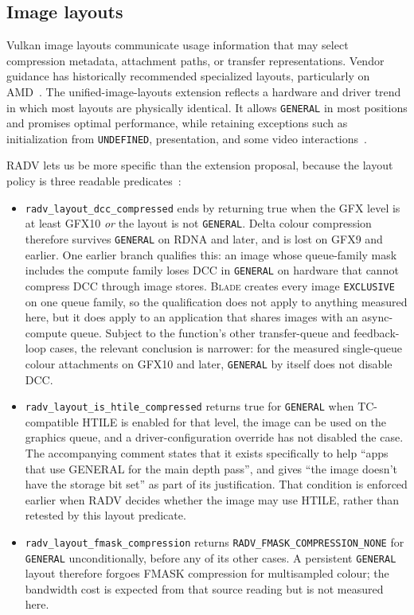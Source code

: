 \documentclass[10pt,twocolumn]{article}
\newcommand{\blade}{\textsc{Blade}}
\begin{document}
\subsection{Image layouts}

Vulkan image layouts communicate usage information that may select compression
metadata, attachment paths, or transfer representations. Vendor guidance has
historically recommended specialized layouts, particularly on
AMD~\cite{amd-rdna-guide}. The unified-image-layouts extension reflects a
hardware and driver trend in which most layouts are physically identical. It
allows \texttt{GENERAL} in most positions and promises optimal performance,
while retaining exceptions such as initialization from
\texttt{UNDEFINED}, presentation, and some video
interactions~\cite{vulkan-unified-layouts}.

RADV lets us be more specific than the extension proposal, because the layout
policy is three readable predicates~\cite{mesa-radv}:

\begin{itemize}
  \item \texttt{radv\_layout\_dcc\_compressed} ends by returning true when the
  GFX level is at least GFX10 \emph{or} the layout is not \texttt{GENERAL}.
  Delta colour compression therefore survives \texttt{GENERAL} on RDNA and
  later, and is lost on GFX9 and earlier. One earlier branch qualifies this:
  an image whose queue-family mask includes the compute family loses DCC in
  \texttt{GENERAL} on hardware that cannot compress DCC through image stores.
  \blade{} creates every image \texttt{EXCLUSIVE} on one queue family, so the
  qualification does not apply to anything measured here, but it does apply to
  an application that shares images with an async-compute queue. Subject to
  the function's other transfer-queue and feedback-loop cases, the relevant
  conclusion is narrower: for the measured single-queue colour attachments on
  GFX10 and later, \texttt{GENERAL} by itself does not disable DCC.
  \item \texttt{radv\_layout\_is\_htile\_compressed} returns true for
  \texttt{GENERAL} when TC-compatible HTILE is enabled for that level, the
  image can be used on the graphics queue, and a driver-configuration override
  has not disabled the case. The accompanying comment states that it exists
  specifically to help ``apps that use GENERAL for the main depth pass'', and
  gives ``the image doesn't have the storage bit set'' as part of its
  justification. That condition is enforced earlier when RADV decides whether
  the image may use HTILE, rather than retested by this layout predicate.
  \item \texttt{radv\_layout\_fmask\_compression} returns
  \texttt{RADV\_FMASK\_COMPRESSION\_NONE} for \texttt{GENERAL}
  unconditionally, before any of its other cases. A persistent
  \texttt{GENERAL} layout therefore forgoes FMASK compression for multisampled
  colour; the bandwidth cost is expected from that source reading but is not
  measured here.
\end{itemize}
\end{document}
